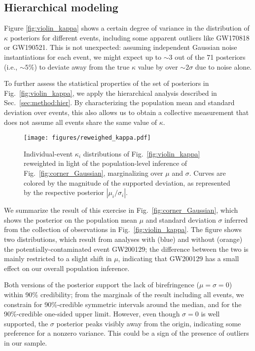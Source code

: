 \documentclass[aps,prd,twocolumn,superscriptaddress,preprintnumbers,nofootinbib]{revtex4-2}
\begin{document}
\subsection{Hierarchical modeling}
\label{sec:results:hier}

Figure \ref{fig:violin_kappa} shows a certain degree of variance in the distribution of $\kappa$ posteriors for different events, including some apparent outliers like GW170818 or GW190521.
This is not unexpected: assuming independent Gaussian noise instantiations for each event, we might expect up to ${\sim}3$ out of the 71 posteriors (i.e., ${\sim}5\%$) to deviate away from the true $\kappa$ value by over ${\sim}2\sigma$ due to noise alone.

To further assess the statistical properties of the set of posteriors in Fig.~\ref{fig:violin_kappa}, we apply the hierarchical analysis described in Sec.~\ref{sec:method:hier}.
By characterizing the population mean and standard deviation over events, this also allows us to obtain a collective measurement that does not assume all events share the same value of $\kappa$.

\begin{figure}
    \texttt{[image: figures/reweighed\_kappa.pdf]}
    \caption{
        Individual-event $\kappa_i$ distributions of Fig.~\ref{fig:violin_kappa} reweighted in light of the population-level inference of Fig.~\ref{fig:corner_Gaussian}, marginalizing over $\mu$ and $\sigma$.
        Curves are colored by the magnitude of the supported deviation, as represented by the respective posterior $|\mu_i / \sigma_i|$.
    }
    \label{fig:reweighted_kappa}
\end{figure}

We summarize the result of this exercise in Fig.~\ref{fig:corner_Gaussian}, which shows the posterior on the population mean $\mu$ and standard deviation $\sigma$ inferred from the collection of observations in Fig.~\ref{fig:violin_kappa}.
The figure shows two distributions, which result from analyses with (blue) and without (orange) the potentially-contaminated event GW200129; the difference between the two is mainly restricted to a slight shift in $\mu$, indicating that GW200129 has a small effect on our overall population inference.

Both versions of the posterior support the lack of birefringence ($\mu = \sigma = 0$) within 90\% credibility; from the marginals of the result including all events, we constrain for 90\%-credible symmetric intervals around the median, and for the 90\%-credible one-sided upper limit.
However, even though $\sigma = 0$ is well supported, the $\sigma$ posterior peaks visibly away from the origin, indicating some preference for a nonzero variance.
This could be a sign of the presence of outliers in our sample.
\end{document}
